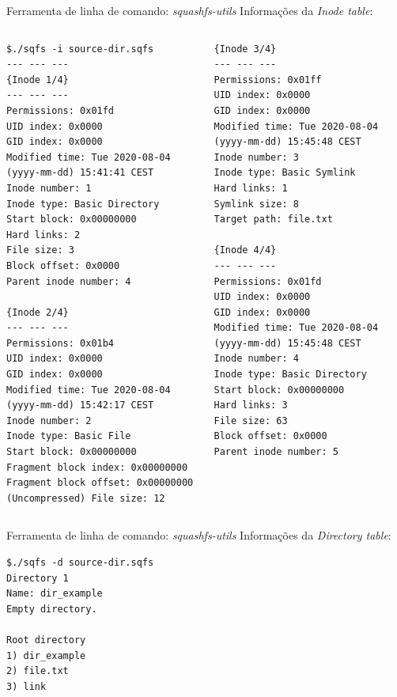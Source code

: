 \begin{frame}[fragile]{Ferramenta de linha de comando: \textit{squashfs-utils}}
Informações da \textit{Inode table}:
   \begin{columns}
   \begin{column}{0.5\textwidth}

\begin{verbatim}
$./sqfs -i source-dir.sqfs
--- --- ---
{Inode 1/4}
--- --- ---
Permissions: 0x01fd
UID index: 0x0000
GID index: 0x0000
Modified time: Tue 2020-08-04 (yyyy-mm-dd) 15:41:41 CEST
Inode number: 1
Inode type: Basic Directory
Start block: 0x00000000
Hard links: 2
File size: 3
Block offset: 0x0000
Parent inode number: 4

{Inode 2/4}
--- --- ---
Permissions: 0x01b4
UID index: 0x0000
GID index: 0x0000
Modified time: Tue 2020-08-04 (yyyy-mm-dd) 15:42:17 CEST
Inode number: 2
Inode type: Basic File
Start block: 0x00000000
Fragment block index: 0x00000000
Fragment block offset: 0x00000000
(Uncompressed) File size: 12
\end{verbatim}
   \end{column}
   \begin{column}{0.5\textwidth}
\begin{verbatim}
{Inode 3/4}
--- --- ---
Permissions: 0x01ff
UID index: 0x0000
GID index: 0x0000
Modified time: Tue 2020-08-04 (yyyy-mm-dd) 15:45:48 CEST
Inode number: 3
Inode type: Basic Symlink
Hard links: 1
Symlink size: 8
Target path: file.txt

{Inode 4/4}
--- --- ---
Permissions: 0x01fd
UID index: 0x0000
GID index: 0x0000
Modified time: Tue 2020-08-04 (yyyy-mm-dd) 15:45:48 CEST
Inode number: 4
Inode type: Basic Directory
Start block: 0x00000000
Hard links: 3
File size: 63
Block offset: 0x0000
Parent inode number: 5
\end{verbatim}
   \end{column}
   \end{columns}
\end{frame}

\begin{frame}[fragile]{Ferramenta de linha de comando: \textit{squashfs-utils}}
Informações da \textit{Directory table}:

\begin{verbatim}
$./sqfs -d source-dir.sqfs
Directory 1
Name: dir_example
Empty directory.

Root directory
1) dir_example
2) file.txt
3) link
\end{verbatim}
\end{frame}

